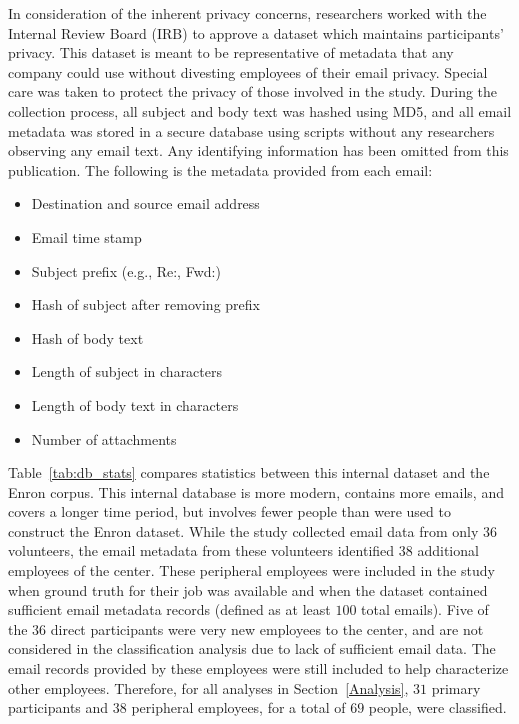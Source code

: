 \documentclass[10pt,twocolumn,conference]{IEEEtran}
\begin{document}
In consideration of the inherent privacy concerns, researchers worked with the Internal Review Board (IRB) to approve a dataset which maintains participants' privacy.
This dataset is meant to be representative of metadata that any company could use without divesting employees of their email privacy.
Special care was taken to protect the privacy of those involved in the study.
During the collection process, all subject and body text was hashed using MD5, and all email metadata was stored in a secure database using scripts without any researchers observing any email text.
Any identifying information has been omitted from this publication.
The following is the metadata provided from each email:
\begin{itemize}
\item Destination and source email address
\item Email time stamp
\item Subject prefix (e.g., Re:, Fwd:)
\item Hash of subject after removing prefix
\item Hash of body text
\item Length of subject in characters
\item Length of body text in characters
\item Number of attachments
\end{itemize}

Table~\ref{tab:db_stats} compares statistics between this internal dataset and the Enron corpus.
This internal database is more modern, contains more emails, and covers a longer time period, but involves fewer people than were used to construct the Enron dataset.
While the study collected email data from only 36 volunteers, the email metadata from these volunteers identified $38$ additional employees of the center.
These peripheral employees were included in the study when ground truth for their job was available and when the dataset contained sufficient email metadata records (defined as at least $100$ total emails).
Five of the $36$ direct participants were very new employees to the center, and are not considered in the classification analysis due to lack of sufficient email data.
The email records provided by these employees were still included to help characterize other employees.
Therefore, for all analyses in Section~\ref{Analysis}, $31$ primary participants and $38$ peripheral employees, for a total of $69$ people, were classified.
\end{document}

